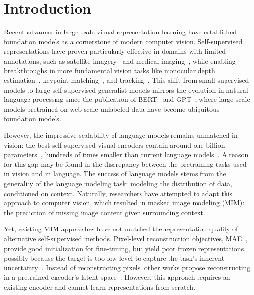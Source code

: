

\section{Introduction}

Recent advances in large-scale visual representation learning have established foundation models as a cornerstone of modern computer vision.
Self-supervised representations have proven particularly effective in domains with limited annotations, such as satellite imagery~\citep{tolan2024very} and medical imaging~\citep{gigapath,virchow,chen2024towards,moutakanni2024advancing,endodino}, while enabling breakthroughs in more fundamental vision tasks like monocular depth estimation~\citep{depthanything,depthpro,depthanythingv2}, keypoint matching~\citep{roma}, and tracking~\citep{dinotracker}.
This shift from small supervised models to large self-supervised generalist models mirrors the evolution in natural language processing since the publication of BERT~\citep{bert} and GPT~\citep{gpt}, where large-scale models pretrained on web-scale unlabeled data have become ubiquitous foundation models.

However, the impressive scalability of language models remains unmatched in vision: the best self-supervised visual encoders contain around one billion parameters~\citep{dinov2}, hundreds of times smaller than current language models~\citep{deepseekv3}.
A reason for this gap may be found in the discrepancy between the pretraining tasks used in vision and in language.
The success of language models stems from the generality of the language modeling task: modeling the distribution of data, conditioned on context.
Naturally, researchers have attempted to adapt this approach to computer vision, which resulted in masked image modeling (MIM): the prediction of missing image content given surrounding context.

Yet, existing MIM approaches have not matched the representation quality of alternative self-supervised methods.
Pixel-level reconstruction objectives, \eg MAE~\citep{he2021masked}, provide good initialization for fine-tuning, but yield poor frozen representations, possibly because the target is too low-level to capture the task's inherent uncertainty~\citep{lecun2022path,ijepa}.
Instead of reconstructing pixels, other works propose reconstructing in a pretrained encoder's latent space~\citep{caev2,eva,eva02}.
However, this approach requires an existing encoder and cannot learn representations from scratch.

